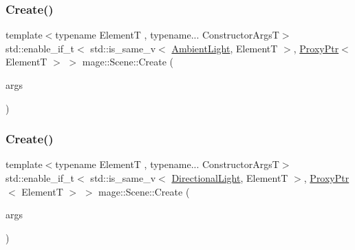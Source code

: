 \hypertarget{classmage_1_1_scene_a2484f1c345b669005feafaad710e3f2c}{}\label{classmage_1_1_scene_a2484f1c345b669005feafaad710e3f2c} 
\subsubsection{\texorpdfstring{Create()}{Create()}\hspace{0.1cm}{\footnotesize\ttfamily [4/11]}}
{\footnotesize\ttfamily template$<$typename ElementT , typename... Constructor\+ArgsT$>$ \\
std\+::enable\+\_\+if\+\_\+t$<$ std\+::is\+\_\+same\+\_\+v$<$ \hyperlink{classmage_1_1_ambient_light}{Ambient\+Light}, ElementT $>$, \hyperlink{classmage_1_1_proxy_ptr}{Proxy\+Ptr}$<$ ElementT $>$ $>$ mage\+::\+Scene\+::\+Create (\begin{DoxyParamCaption}\item[{Constructor\+ArgsT \&\&...}]{args }\end{DoxyParamCaption})}

\hypertarget{classmage_1_1_scene_af0e1e0cdd4d01ce9a07de2527bfde340}{}\label{classmage_1_1_scene_af0e1e0cdd4d01ce9a07de2527bfde340} 
\subsubsection{\texorpdfstring{Create()}{Create()}\hspace{0.1cm}{\footnotesize\ttfamily [5/11]}}
{\footnotesize\ttfamily template$<$typename ElementT , typename... Constructor\+ArgsT$>$ \\
std\+::enable\+\_\+if\+\_\+t$<$ std\+::is\+\_\+same\+\_\+v$<$ \hyperlink{classmage_1_1_directional_light}{Directional\+Light}, ElementT $>$, \hyperlink{classmage_1_1_proxy_ptr}{Proxy\+Ptr}$<$ ElementT $>$ $>$ mage\+::\+Scene\+::\+Create (\begin{DoxyParamCaption}\item[{Constructor\+ArgsT \&\&...}]{args }\end{DoxyParamCaption})}

\hypertarget{classmage_1_1_scene_ace6a5be772dfe8d1f07997a069468d57}{}\label{classmage_1_1_scene_ace6a5be772dfe8d1f07997a069468d57} 
